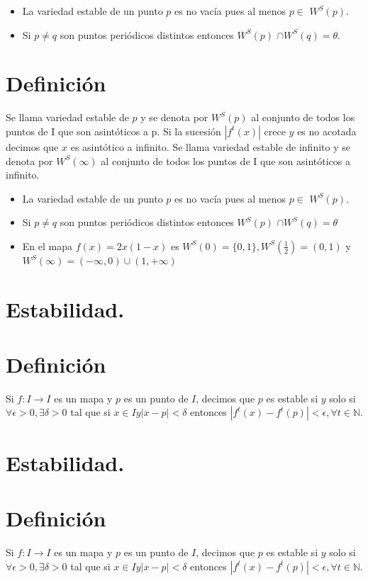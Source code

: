 \documentclass[11pt]{beamer}
\begin{document}
\begin{itemize}
  \item La variedad estable de un punto $p$ es no vacía pues al menos $p \in$ $W^{S}(p)$.
  \item Si $p \neq q$ son puntos periódicos distintos entonces $W^{S}(p)$ $\cap W^{S}(q)=\theta$.
\end{itemize}

\section*{Definición}
Se llama variedad estable de $p$ y se denota por $W^{S}(p)$ al conjunto de todos los puntos de I que son asintóticos a p. Si la sucesión $\left|f^{t}(x)\right|$ crece $y$ es no acotada decimos que $x$ es asintótico a infinito. Se llama variedad estable de infinito y se denota por $W^{S}(\infty)$ al conjunto de todos los puntos de I que son asintóticos a infinito.

\begin{itemize}
  \item La variedad estable de un punto $p$ es no vacía pues al menos $p \in$ $W^{S}(p)$.
  \item Si $p \neq q$ son puntos periódicos distintos entonces $W^{S}(p)$ $\cap W^{S}(q)=\theta$
  \item En el mapa $f(x)=2 x(1-x)$ es $W^{S}(0)=\{0,1\}, W^{S}\left(\frac{1}{2}\right)=(0,1)$ y $W^{S}(\infty)=(-\infty, 0) \cup(1,+\infty)$
\end{itemize}

\section*{Estabilidad.}
\section*{Definición}
Si $f: I \rightarrow I$ es un mapa y $p$ es un punto de $I$, decimos que $p$ es estable si $y$ solo si $\forall \epsilon>0, \exists \delta>0$ tal que si $x \in I y|x-p|<\delta$ entonces $\left|f^{t}(x)-f^{t}(p)\right|<\epsilon, \forall t \in \mathbb{N}$.

\section*{Estabilidad.}
\section*{Definición}
Si $f: I \rightarrow I$ es un mapa y $p$ es un punto de $I$, decimos que $p$ es estable si $y$ solo si $\forall \epsilon>0, \exists \delta>0$ tal que si $x \in I y|x-p|<\delta$ entonces $\left|f^{t}(x)-f^{t}(p)\right|<\epsilon, \forall t \in \mathbb{N}$.
\end{document}
